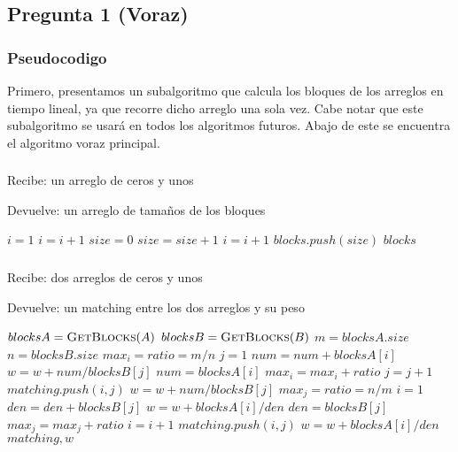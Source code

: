 \subsection*{Pregunta 1 (Voraz)}
\subsubsection*{Pseudocodigo}
Primero, presentamos un subalgoritmo que calcula los bloques de los arreglos en tiempo lineal, ya que recorre dicho arreglo una sola vez. Cabe notar que este subalgoritmo se usará en todos los algoritmos futuros. Abajo de este se encuentra el algoritmo voraz principal.
\subsubsection*{}
Recibe: un arreglo de ceros y unos

Devuelve: un arreglo de tamaños de los bloques
\begin{algorithmic}[1]
  \STATE $i = 1$
        \STATE $i = i + 1$
    \ENDWHILE
    \STATE $size = 0$
            \STATE $size = size + 1$
            \STATE $i = i + 1$
        \ENDWHILE
        \STATE $blocks.push(size)$
    \ENDIF
  \ENDWHILE
  \RETURN $blocks$
\end{algorithmic}
\subsubsection*{}
Recibe: dos arreglos de ceros y unos

Devuelve: un matching entre los dos arreglos y su peso
\begin{algorithmic}[1]
  \STATE $blocksA = \textsc{GetBlocks$(A)$}$
  \STATE $blocksB = \textsc{GetBlocks$(B)$}$
  \STATE $m = blocksA.size$
  \STATE $n = blocksB.size$
    \STATE $max_i = ratio = m/n$
    \STATE $j = 1$
            \STATE $num = num + blocksA[i]$
        \ELSE
            \STATE $w = w + num/blocksB[j]$
            \STATE $num = blocksA[i]$
            \STATE $max_i = max_i + ratio$
            \STATE $j = j + 1$
        \ENDIF
        \STATE $matching.push(i,j)$
    \ENDFOR
    \STATE $w = w + num/blocksB[j]$
  \ELSE
    \STATE $max_j = ratio = n/m$
    \STATE $i = 1$
            \STATE $den = den + blocksB[j]$
        \ELSE
            \STATE $w = w + blocksA[i]/den$
            \STATE $den = blocksB[j]$
            \STATE $max_j = max_j + ratio$
            \STATE $i = i + 1$
        \ENDIF
        \STATE $matching.push(i,j)$
    \ENDFOR
    \STATE $w = w + blocksA[i]/den$
  \ENDIF
  \RETURN $matching, w$
\end{algorithmic}

